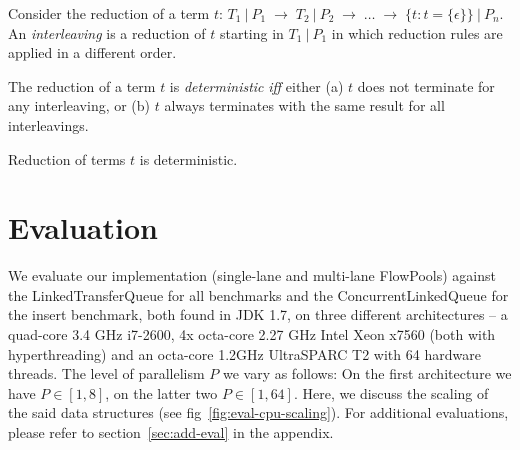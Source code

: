\documentclass[runningheads,a4paper]{llncs}
\newcommand{\set}[1]{\{#1\}}
\begin{document}
\begin{definition}[Interleaving]
  Consider the reduction of a term $t$: $T_1~|~P_1 \;\longrightarrow\;
  T_2~|~P_2 \;\longrightarrow\; \ldots \;\longrightarrow\;
  \set{t : t = \set{\epsilon}}~|~P_n$. An \emph{interleaving} is a reduction of $t$
  starting in $T_1~|~P_1$ in which reduction rules are
  applied in a different order.
\end{definition}


\begin{definition}[Determinism]
The reduction of a term $t$ is \emph{deterministic} \emph{iff} either
(a) $t$ does not terminate for any interleaving, or (b) $t$ always
terminates with the same result for all interleavings.
\end{definition}

\begin{theorem}
Reduction of terms $t$ is deterministic.
\end{theorem}


\section{Evaluation}
\label{sec:evaluation}

We evaluate our implementation (single-lane and multi-lane
FlowPools) against the LinkedTransferQueue \cite{SchererLS09} for all
benchmarks and the ConcurrentLinkedQueue \cite{Michael96} for the
insert benchmark, both found in JDK 1.7, on three different
architectures -- a quad-core 3.4 GHz i7-2600, 4x octa-core 2.27 GHz
Intel Xeon x7560 (both with hyperthreading) and an octa-core 1.2GHz
UltraSPARC T2 with 64 hardware threads. The level of parallelism $P$
we vary as follows: On the first architecture we have $P \in [1, 8]$,
on the latter two $P \in [1,64]$. Here, we discuss the scaling of the
said data structures (see fig~\ref{fig:eval-cpu-scaling}). For
additional evaluations, please refer to section~\ref{sec:add-eval} in
the appendix.
\end{document}
